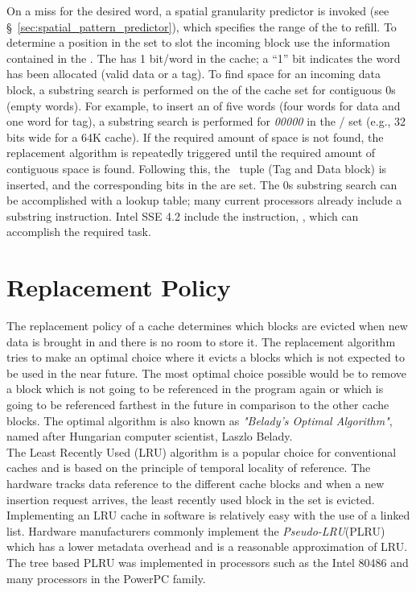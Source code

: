 On a miss for the desired word, a spatial granularity predictor is invoked (see \S~\ref{sec:spatial_pattern_predictor}), which specifies the range of the \AB{} to refill. To determine a position in the set to slot the incoming block use the information contained in the . The  has 1 bit/word in the cache; a ``1'' bit indicates the word has been allocated (valid data or a tag). To find space for an incoming data block, a substring search is performed on the  of the cache set for contiguous 0s (empty words). For example, to insert an \AB{} of five words (four words for data and one word for tag), a substring search is performed for \textit{00000} in the  / set (e.g., 32 bits wide for a 64K cache). If the required amount of space is not found, the replacement algorithm is repeatedly triggered until the required amount of contiguous space is found. Following this, the \AB\ tuple (Tag and Data block) is inserted, and the corresponding bits in the  are set. The 0s substring search can be accomplished with a lookup table; many current processors already include a substring instruction. Intel SSE 4.2 include the instruction, , which can accomplish the required task.

\section{Replacement Policy}
\label{sec:replacement_policy}
The replacement policy of a cache determines which blocks are evicted when new data is brought in and there is no room to store it. The replacement algorithm tries to make an optimal choice where it evicts a blocks which is not expected to be used in the near future. The most optimal choice possible would be to remove a block which is not going to be referenced in the program again or which is going to be referenced farthest in the future in comparison to the other cache blocks. The optimal algorithm is also known as \textit{"Belady's Optimal Algorithm"}, named after Hungarian computer scientist, Laszlo Belady.
\\

The Least Recently Used (LRU) algorithm is a popular choice for conventional caches and is based on the principle of temporal locality of reference. The hardware tracks data reference to the different cache blocks and when a new insertion request arrives, the least recently used block in the set is evicted. Implementing an LRU cache in software is relatively easy with the use of a linked list. Hardware manufacturers commonly implement the \textit{Pseudo-LRU}(PLRU) which has a lower metadata overhead and is a reasonable approximation of LRU. The tree based PLRU was implemented in processors such as the Intel 80486 and many processors in the PowerPC family. 

